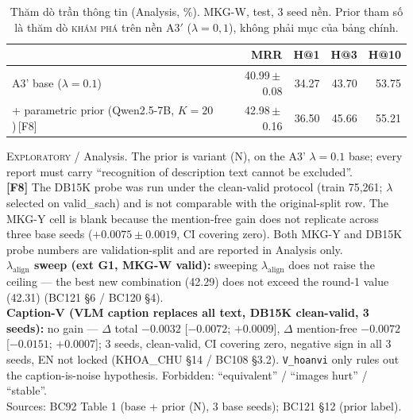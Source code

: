 \begin{table}[t]
\centering
\footnotesize
\setlength{\tabcolsep}{4pt}
\caption{Thăm dò trần thông tin (Analysis, \%). MKG-W, test, 3 seed nền. Prior tham số là thăm dò \textsc{khám phá} trên nền A3$'$ ($\lambda{=}0{,}1$), không phải mục của bảng chính.}
\label{tab:ceiling}
\begin{tabular}{l r r r r}
\toprule
 & MRR & H@1 & H@3 & H@10 \\
\midrule
A3' base ($\lambda{=}0.1$) & 40.99\,$\pm$\,0.08 & 34.27 & 43.70 & 53.75 \\
\;+ parametric prior (Qwen2.5-7B, $K{=}20$)\,[F8] & 42.98\,$\pm$\,0.16 & 36.50 & 45.66 & 55.21 \\
\bottomrule
\end{tabular}

\vspace{2pt}
\begin{minipage}{\linewidth}\footnotesize\raggedright
\textsc{Exploratory} / Analysis. The prior is variant (N), on the A3' $\lambda{=}0.1$ base; every report must carry ``recognition of description text cannot be excluded''. \\
\textbf{[F8]} The DB15K probe was run under the clean-valid protocol (train 75,261; $\lambda$ selected on valid\_sach) and is not comparable with the original-split row. The MKG-Y cell is blank because the mention-free gain does not replicate across three base seeds ($+0.0075 \pm 0.0019$, CI covering zero). Both MKG-Y and DB15K probe numbers are validation-split and are reported in Analysis only. \\
\textbf{$\lambda_{\text{align}}$ sweep (ext G1, MKG-W valid):} sweeping $\lambda_{\text{align}}$ does not raise the ceiling --- the best new combination (42.29) does not exceed the round-1 value (42.31) (BC121 §6 / BC120 §4). \\
\textbf{Caption-V (VLM caption replaces all text, DB15K clean-valid, 3 seeds):} no gain --- $\Delta$ total $-0.0032$ [$-0.0072$; $+0.0009$], $\Delta$ mention-free $-0.0072$ [$-0.0151$; $+0.0007$]; 3 seeds, clean-valid, CI covering zero, negative sign in all 3 seeds, EN not locked (KHOA\_CHU §14 / BC108 §3.2). \texttt{V\_hoanvi} only rules out the caption-is-noise hypothesis. Forbidden: ``equivalent'' / ``images hurt'' / ``stable''. \\
Sources: BC92 Table 1 (base + prior (N), 3 base seeds); BC121 §12 (prior label). \\
\end{minipage}
\end{table}

